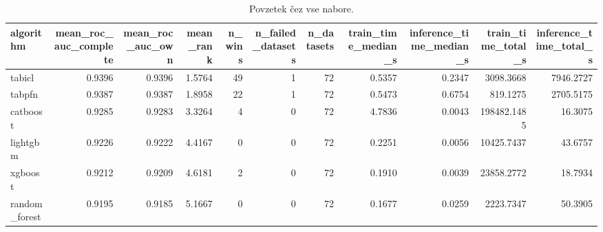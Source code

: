 \begin{table}[htbp]
\centering
\caption{Povzetek čez vse nabore.}
\label{tab:overall}
\begin{tabular}{lrrrrrrrrrr}
\hline
algorithm & mean\_roc\_auc\_complete & mean\_roc\_auc\_own & mean\_rank & n\_wins & n\_failed\_datasets & n\_datasets & train\_time\_median\_s & inference\_time\_median\_s & train\_time\_total\_s & inference\_time\_total\_s \\
\hline
tabicl & 0.9396 & 0.9396 & 1.5764 & 49 & 1 & 72 & 0.5357 & 0.2347 & 3098.3668 & 7946.2727 \\
tabpfn & 0.9387 & 0.9387 & 1.8958 & 22 & 1 & 72 & 0.5473 & 0.6754 & 819.1275 & 2705.5175 \\
catboost & 0.9285 & 0.9283 & 3.3264 & 4 & 0 & 72 & 4.7836 & 0.0043 & 198482.1485 & 16.3075 \\
lightgbm & 0.9226 & 0.9222 & 4.4167 & 0 & 0 & 72 & 0.2251 & 0.0056 & 10425.7437 & 43.6757 \\
xgboost & 0.9212 & 0.9209 & 4.6181 & 2 & 0 & 72 & 0.1910 & 0.0039 & 23858.2772 & 18.7934 \\
random\_forest & 0.9195 & 0.9185 & 5.1667 & 0 & 0 & 72 & 0.1677 & 0.0259 & 2223.7347 & 50.3905 \\
\hline
\end{tabular}
\end{table}
